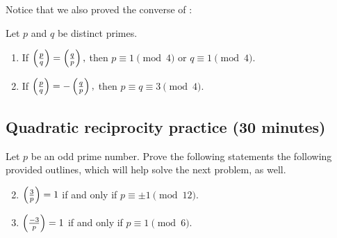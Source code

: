 \documentclass[letterpaper, 11 pt]{ximera}
\begin{document}
Notice that we also proved the converse of :
\begin{corollary}\label{cor:quad-rec}
	Let $p$ and $q$ be distinct primes.  
	\begin{enumerate}[label=(\alph*)]
		\item If $\left(\frac{p}{q}\right)=\left(\frac{q}{p}\right),$ then $p\equiv 1 \pmod{4}$ or $q\equiv 1\pmod{4}.$
 		\item If $\left(\frac{p}{q}\right)=-\left(\frac{q}{p}\right),$ then $p\equiv q \equiv 3 \pmod{4}.$
	\end{enumerate}
\end{corollary}


\subsection{Quadratic reciprocity practice (30 minutes)}

\begin{br}
	Let $p$ be an odd prime number. Prove the following statements the following provided outlines, which will help solve the next problem, as well.
	
	\begin{enumerate}[label=(\alph*)]
	\setcounter{enumi}{1}
		\item $\left(\frac{3}{p}\right)=1$ if and only if $p\equiv \pm1\pmod{12}.$
		\item $\left(\frac{-3}{p}\right)=1$ if and only if $p\equiv 1\pmod{6}.$	
	\end{enumerate}
\end{br}
\end{document}
